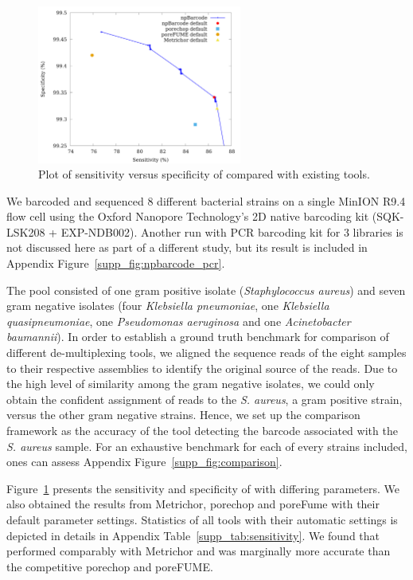 \begin{figure}[ht]
\centerline{\includegraphics[width=0.6\textwidth]{images/roc.pdf}}
\caption{Plot of sensitivity versus specificity of \npbarcode{} compared
with existing tools.}
\label{fig:sen}
\end{figure}

We barcoded and sequenced 8 different bacterial strains on a single MinION R9.4 flow cell using the Oxford Nanopore Technology's 2D native barcoding kit (SQK-LSK208 + EXP-NDB002). Another run with PCR barcoding kit for 3 libraries is not discussed here as part of a different study, but its result is included in Appendix Figure~\ref{supp_fig:npbarcode_pcr}.

The pool consisted of one gram positive isolate (\emph{Staphylococcus aureus}) and seven gram negative isolates (four \emph{Klebsiella pneumoniae}, one \emph{Klebsiella quasipneumoniae}, one \emph{Pseudomonas aeruginosa} and one \emph{Acinetobacter baumannii}).
In order to establish a ground truth benchmark for  comparison of different de-multiplexing tools, we aligned the sequence reads of the eight samples to their respective assemblies to identify the original source of the reads. 
Due to the high level of similarity among the gram negative isolates, we could only obtain the confident assignment of reads to the \emph{S. aureus}, a gram positive strain, versus the other gram negative strains. 
Hence, we set up the comparison framework as the accuracy of the tool detecting the barcode associated with the \emph{S. aureus} sample. For an exhaustive benchmark for each of every strains included, ones can assess Appendix Figure~\ref{supp_fig:comparison}.

Figure~\ref{fig:sen} presents the sensitivity and specificity of \npbarcode{} with differing parameters. We also obtained the results from Metrichor, porechop and poreFume with their default parameter settings. 
Statistics of all tools with their automatic settings is depicted in details in Appendix Table~\ref{supp_tab:sensitivity}.
We found that \npbarcode{} performed comparably with Metrichor and was marginally more accurate than the competitive porechop and poreFUME.


